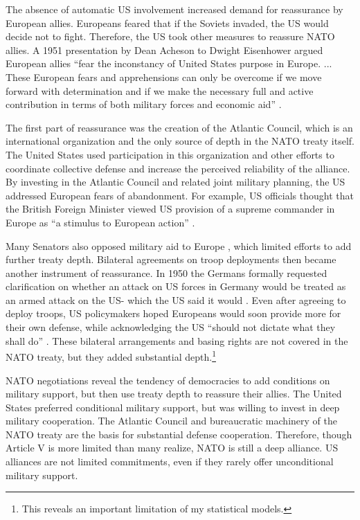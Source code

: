 \documentclass[12pt]{article}
\begin{document}
The absence of automatic US involvement increased demand for reassurance by European allies. 
Europeans feared that if the Soviets invaded, the US would decide not to fight. 
Therefore, the US took other measures to reassure NATO allies. 
A 1951 presentation by Dean Acheson to Dwight Eisenhower argued European allies ``fear the inconstancy of United States purpose in Europe. ... These European fears and apprehensions can only be overcome if we move forward with determination and if we make the necessary full and active contribution in terms of both military forces and economic aid'' \citep[pg. 3]{Acheson1951}. 


The first part of reassurance was the creation of the Atlantic Council, which is an international organization and the only source of depth in the NATO treaty itself. 
The United States used participation in this organization and other efforts to coordinate collective defense and increase the perceived reliability of the alliance. 
By investing in the Atlantic Council and related joint military planning, the US addressed European fears of abandonment. 
For example, US officials thought that the British Foreign Minister viewed US provision of a supreme commander in Europe as ``a stimulus to European action'' \citep{Acheson1950}. 


Many Senators also opposed military aid to Europe \citep[pg 285]{Acheson1969}, which limited efforts to add further treaty depth. 
Bilateral agreements on troop deployments then became another instrument of reassurance. 
In 1950 the Germans formally requested clarification on whether an attack on US forces in Germany would be treated as an armed attack on the US- which the US said it would \citep[pg. 395]{Acheson1969}.  
Even after agreeing to deploy troops, US policymakers hoped Europeans would soon provide more for their own defense, while acknowledging the US ``should not dictate what they shall do'' \citep[pg. 2]{Johnson1950}. 
These bilateral arrangements and basing rights are not covered in the NATO treaty, but they added substantial depth.\footnote{This reveals an important limitation of my statistical models.}  


NATO negotiations reveal the tendency of democracies to add conditions on military support, but then use treaty depth to reassure their allies. 
The United States preferred conditional military support, but was willing to invest in deep military cooperation. 
The Atlantic Council and bureaucratic machinery of the NATO treaty are the basis for substantial defense cooperation. 
Therefore, though Article V is more limited than many realize, NATO is still a deep alliance. 
US alliances are not limited commitments, even if they rarely offer unconditional military support. 
\end{document}

